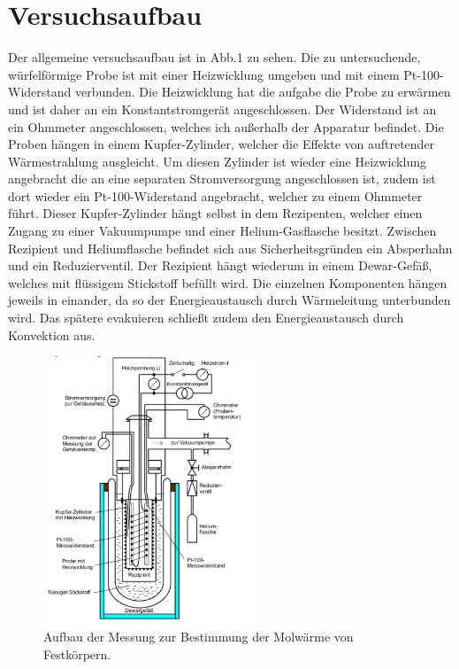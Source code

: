 \newpage

\section{Versuchsaufbau}
Der allgemeine versuchsaufbau ist in Abb.1 zu sehen. Die zu untersuchende, würfelförmige
Probe ist mit einer Heizwicklung umgeben und mit einem Pt-100-Widerstand verbunden. Die
Heizwicklung hat die aufgabe die Probe zu erwärmen und ist daher an ein Konstantstromgerät
angeschlossen. Der Widerstand ist an ein Ohmmeter angeschlossen, welches ich außerhalb der
Apparatur befindet. Die Proben hängen in einem Kupfer-Zylinder, welcher die Effekte von
auftretender Wärmestrahlung ausgleicht. Um diesen Zylinder ist wieder eine Heizwicklung
angebracht die an eine separaten Stromversorgung angeschlossen ist, zudem ist dort wieder
ein Pt-100-Widerstand angebracht, welcher zu einem
Ohmmeter führt. Dieser Kupfer-Zylinder hängt selbst in dem Rezipenten, welcher einen
Zugang zu einer Vakuumpumpe und einer Helium-Gasflasche besitzt. Zwischen Rezipient und
Heliumflasche befindet sich aus Sicherheitsgründen ein Absperhahn und ein Reduzierventil.
Der Rezipient hängt wiederum in einem Dewar-Gefäß, welches mit flüssigem Stickstoff befüllt
wird. Die einzelnen Komponenten hängen jeweils in einander, da so der Energieaustausch durch
Wärmeleitung unterbunden wird. Das spätere evakuieren schließt zudem den Energieaustausch
durch Konvektion aus.
\begin{figure}[h!]
 \centering
 \includegraphics[height=8.0cm]{content/V47.pdf}
 \caption{Aufbau der Messung zur Bestimmung der Molwärme von Festkörpern.}
 \label{fig:Versuchsaufbau1}
\end{figure}
\FloatBarrier

